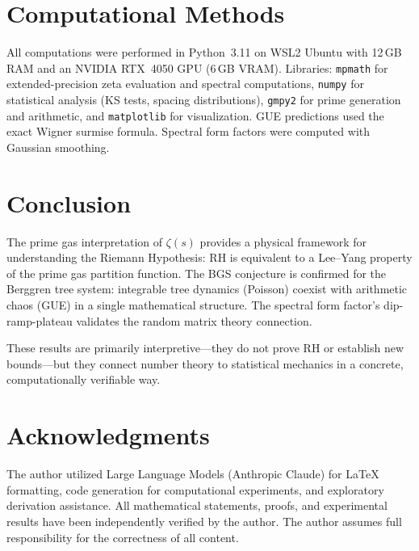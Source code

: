 \documentclass[12pt]{amsart}
\theoremstyle{definition}
\theoremstyle{remark}
\begin{document}
\section{Computational Methods}\label{sec:computational}

All computations were performed in Python~3.11 on WSL2 Ubuntu with 12\,GB
RAM and an NVIDIA RTX~4050 GPU (6\,GB VRAM). Libraries: \texttt{mpmath}
for extended-precision zeta evaluation and spectral computations,
\texttt{numpy} for statistical analysis (KS tests, spacing distributions),
\texttt{gmpy2} for prime generation and arithmetic, and \texttt{matplotlib}
for visualization. GUE predictions used the exact Wigner surmise formula.
Spectral form factors were computed with Gaussian smoothing.

\section{Conclusion}\label{sec:conclusion}

The prime gas interpretation of $\zeta(s)$ provides a physical framework
for understanding the Riemann Hypothesis: RH is equivalent to a Lee--Yang
property of the prime gas partition function. The BGS conjecture is
confirmed for the Berggren tree system: integrable tree dynamics (Poisson)
coexist with arithmetic chaos (GUE) in a single mathematical structure.
The spectral form factor's dip-ramp-plateau validates the random matrix
theory connection.

These results are primarily interpretive---they do not prove RH or establish
new bounds---but they connect number theory to statistical mechanics in a
concrete, computationally verifiable way.

\section*{Acknowledgments}
The author utilized Large Language Models (Anthropic Claude) for \LaTeX{}
formatting, code generation for computational experiments, and exploratory
derivation assistance. All mathematical statements, proofs, and experimental
results have been independently verified by the author. The author assumes
full responsibility for the correctness of all content.
\end{document}
